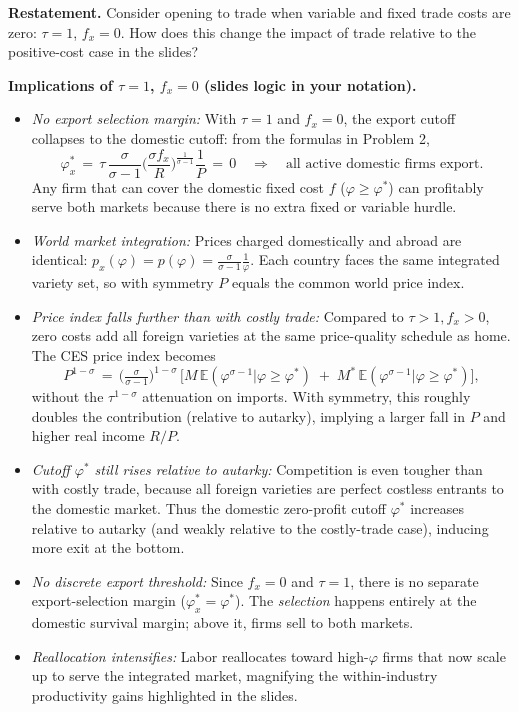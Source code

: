 \begin{solution}
	\textbf{Restatement.} Consider opening to trade when variable and fixed trade costs are zero: $\tau=1$, $f_x=0$. How does this change the impact of trade relative to the positive-cost case in the slides?

\bigskip
	\textbf{Implications of $\tau=1$, $f_x=0$ (slides logic in your notation).}
\begin{itemize}
	\item \emph{No export selection margin:} With $\tau=1$ and $f_x=0$, the export cutoff collapses to the domestic cutoff: from the formulas in Problem 2,
	\[
		\varphi_x^* \,=\, \tau\, \frac{\sigma}{\sigma-1}\Big(\frac{\sigma f_x}{R}\Big)^{\!\tfrac{1}{\sigma-1}} \frac{1}{P} \,=\, 0 \quad \Rightarrow \quad \text{all active domestic firms export.}
	\]
	Any firm that can cover the domestic fixed cost $f$ ($\varphi\ge \varphi^*$) can profitably serve both markets because there is no extra fixed or variable hurdle.
	\item \emph{World market integration:} Prices charged domestically and abroad are identical: $p_x(\varphi)=p(\varphi)=\tfrac{\sigma}{\sigma-1}\tfrac{1}{\varphi}$. Each country faces the same integrated variety set, so with symmetry $P$ equals the common world price index.
	\item \emph{Price index falls further than with costly trade:} Compared to $\tau>1, f_x>0$, zero costs add all foreign varieties at the same price-quality schedule as home. The CES price index becomes
	\[
		P^{1-\sigma} \,=\, \Big(\tfrac{\sigma}{\sigma-1}\Big)^{1-\sigma}\,\Big[ M\, \mathbb{E}(\varphi^{\sigma-1}|\varphi\ge \varphi^*) \; + \; M^*\, \mathbb{E}(\varphi^{\sigma-1}|\varphi\ge \varphi^*) \Big],
	\]
	without the $\tau^{1-\sigma}$ attenuation on imports. With symmetry, this roughly doubles the contribution (relative to autarky), implying a larger fall in $P$ and higher real income $R/P$.
	\item \emph{Cutoff $\varphi^*$ still rises relative to autarky:} Competition is even tougher than with costly trade, because all foreign varieties are perfect costless entrants to the domestic market. Thus the domestic zero-profit cutoff $\varphi^*$ increases relative to autarky (and weakly relative to the costly-trade case), inducing more exit at the bottom.
	\item \emph{No discrete export threshold:} Since $f_x=0$ and $\tau=1$, there is no separate export-selection margin ($\varphi_x^*=\varphi^*$). The \emph{selection} happens entirely at the domestic survival margin; above it, firms sell to both markets.
	\item \emph{Reallocation intensifies:} Labor reallocates toward high-$\varphi$ firms that now scale up to serve the integrated market, magnifying the within-industry productivity gains highlighted in the slides.
\end{itemize}


\end{solution}
